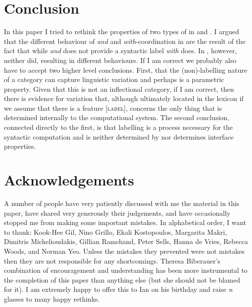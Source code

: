 \documentclass[output=paper]{langsci/langscibook}
\begin{document}
\section{Conclusion}

In this paper I tried to rethink the properties of two types of
 in  and . I argued that the
different behaviour of \emph{and} and \emph{with}-coor\-di\-na\-tion in
 are the result of the fact that while \emph{and} does not provide
a syntactic label \emph{with} does. In , however, neither did,
resulting in different behaviours. If I am correct we probably also have to
accept two higher level conclusions. First, that the (non)-labelling nature of
a category can capture linguistic variation and perhaps is a parametric
property. Given that this is not an inflectional category, if I am correct,
then there is evidence for variation that, although ultimately located in the
lexicon if we assume that there is a feature [\textsc{label}], concerns the only thing
that is determined internally to the computational system. The second
conclusion, connected directly to the first, is that labelling is a process
necessary for the syntactic computation and is neither determined by nor
determines interface properties.

\printchapterglossary{}

\section*{Acknowledgements}

A number of people have very patiently discussed with me the material in this
paper, have shared very generously their judgements, and have occasionally
stopped me from making some important mistakes. In alphabetical order, I want
to thank: Kook-Hee Gil, Nino Grillo, Ekali Kostopoulos, Margarita Makri,
Dimitris Michelioudakis, Gillian Ramchand, Peter Sells, Hanna de Vries, Rebecca
Woods, and Norman Yeo. Unless the mistakes they prevented were not mistakes
then they are not responsible for any shortcomings. Theresa Biberauer’s
combination of encouragement and understanding has been more instrumental to
the completion of this paper than anything else (but she should not be blamed
for it). I am extremely happy to offer this to Ian on his birthday and raise
\emph{n} glasses to many happy rethinks.

\newpage\largerpage
{\sloppy\printbibliography[heading=subbibliography,notkeyword=this]}
\end{document}
